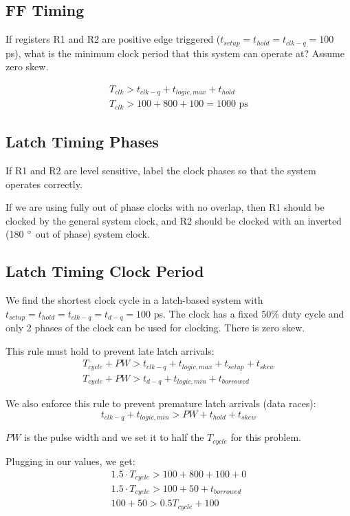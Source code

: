 \documentclass[11pt]{article}
\begin{document}
\subsection{FF Timing}
If registers R1 and R2 are positive edge triggered ($t_{setup} = t_{hold} = t_{clk-q} = 100$ ps), what is the minimum clock period that this system can operate at? Assume zero skew.

\begin{eqnarray}
	T_{clk} > t_{clk-q} + t_{logic,max} + t_{hold} \nonumber \\
	T_{clk} > 100 + 800 + 100 = 1000 \text{ ps} \nonumber
\end{eqnarray}

\subsection{Latch Timing Phases}
If R1 and R2 are level sensitive, label the clock phases so that the system operates correctly.

If we are using fully out of phase clocks with no overlap, then R1 should be clocked by the general system clock, and R2 should be clocked with an inverted (180 $\degree$ out of phase) system clock.

\subsection{Latch Timing Clock Period}
We find the shortest clock cycle in a latch-based system with $t_{setup} = t_{hold} = t_{clk-q} = t_{d-q} = 100$ ps. The clock has a fixed 50\% duty cycle and only 2 phases of the clock can be used for clocking. There is zero skew.

This rule must hold to prevent late latch arrivals:
\begin{eqnarray}
	T_{cycle} + PW > t_{clk-q} + t_{logic,max} + t_{setup} + t_{skew} \\ 
	T_{cycle} + PW > t_{d-q} + t_{logic,min} + t_{borrowed}
\end{eqnarray}

We also enforce this rule to prevent premature latch arrivals (data races):
\begin{equation}
	t_{clk-q} + t_{logic,min} > PW + t_{hold} + t_{skew}
\end{equation}

$PW$ is the pulse width and we set it to half the $T_{cycle}$ for this problem.

Plugging in our values, we get:
\begin{eqnarray}
	1.5 \cdot T_{cycle} > 100 + 800 + 100 + 0 \nonumber \\
	1.5 \cdot T_{cycle} > 100 + 50 + t_{borrowed} \nonumber \\
	100 + 50 > 0.5 T_{cycle} + 100 \nonumber 
\end{eqnarray}
\end{document}
